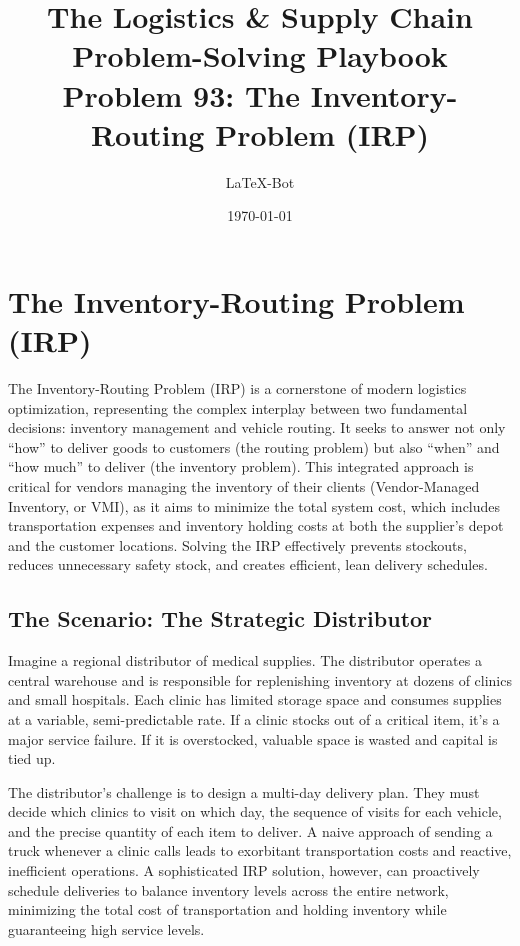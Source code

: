 \documentclass{article}
\title{The Logistics \& Supply Chain Problem-Solving Playbook\\
\large Problem 93: The Inventory-Routing Problem (IRP)}
\author{LaTeX-Bot}
\date{\today}
\begin{document}
\maketitle
\tableofcontents
\newpage

\section{The Inventory-Routing Problem (IRP)}

The Inventory-Routing Problem (IRP) is a cornerstone of modern logistics optimization, representing the complex interplay between two fundamental decisions: inventory management and vehicle routing. It seeks to answer not only ``how'' to deliver goods to customers (the routing problem) but also ``when'' and ``how much'' to deliver (the inventory problem). This integrated approach is critical for vendors managing the inventory of their clients (Vendor-Managed Inventory, or VMI), as it aims to minimize the total system cost, which includes transportation expenses and inventory holding costs at both the supplier's depot and the customer locations. Solving the IRP effectively prevents stockouts, reduces unnecessary safety stock, and creates efficient, lean delivery schedules.

\subsection{The Scenario: The Strategic Distributor}
Imagine a regional distributor of medical supplies. The distributor operates a central warehouse and is responsible for replenishing inventory at dozens of clinics and small hospitals. Each clinic has limited storage space and consumes supplies at a variable, semi-predictable rate. If a clinic stocks out of a critical item, it's a major service failure. If it is overstocked, valuable space is wasted and capital is tied up.

The distributor's challenge is to design a multi-day delivery plan. They must decide which clinics to visit on which day, the sequence of visits for each vehicle, and the precise quantity of each item to deliver. A naive approach of sending a truck whenever a clinic calls leads to exorbitant transportation costs and reactive, inefficient operations. A sophisticated IRP solution, however, can proactively schedule deliveries to balance inventory levels across the entire network, minimizing the total cost of transportation and holding inventory while guaranteeing high service levels.
\end{document}
